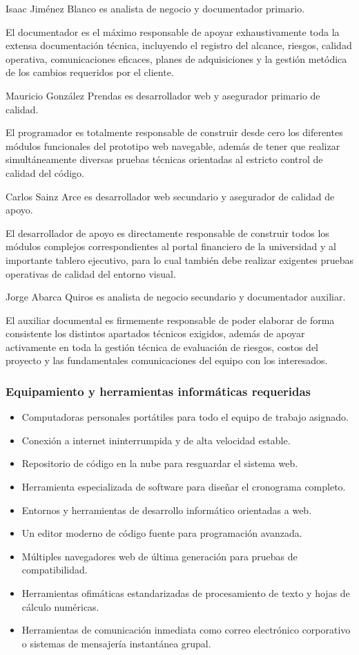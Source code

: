 \documentclass[11pt,spanish]{article}
\begin{document}
Isaac Jiménez Blanco es analista de negocio y documentador primario.

El documentador es el máximo responsable de apoyar exhaustivamente toda la extensa documentación técnica, incluyendo el registro del alcance, riesgos, calidad operativa, comunicaciones eficaces, planes de adquisiciones y la gestión metódica de los cambios requeridos por el cliente.

Mauricio González Prendas es desarrollador web y asegurador primario de calidad.

El programador es totalmente responsable de construir desde cero los diferentes módulos funcionales del prototipo web navegable, además de tener que realizar simultáneamente diversas pruebas técnicas orientadas al estricto control de calidad del código.

Carlos Sainz Arce es desarrollador web secundario y asegurador de calidad de apoyo.

El desarrollador de apoyo es directamente responsable de construir todos los módulos complejos correspondientes al portal financiero de la universidad y al importante tablero ejecutivo, para lo cual también debe realizar exigentes pruebas operativas de calidad del entorno visual.

Jorge Abarca Quiros es analista de negocio secundario y documentador auxiliar.

El auxiliar documental es firmemente responsable de poder elaborar de forma consistente los distintos apartados técnicos exigidos, además de apoyar activamente en toda la gestión técnica de evaluación de riesgos, costos del proyecto y las fundamentales comunicaciones del equipo con los interesados.

\subsubsection{Equipamiento y herramientas informáticas requeridas}

\begin{itemize}
    \item Computadoras personales portátiles para todo el equipo de trabajo asignado.
    \item Conexión a internet ininterrumpida y de alta velocidad estable.
    \item Repositorio de código en la nube para resguardar el sistema web.
    \item Herramienta especializada de software para diseñar el cronograma completo.
    \item Entornos y herramientas de desarrollo informático orientadas a web.
    \item Un editor moderno de código fuente para programación avanzada.
    \item Múltiples navegadores web de última generación para pruebas de compatibilidad.
    \item Herramientas ofimáticas estandarizadas de procesamiento de texto y hojas de cálculo numéricas.
    \item Herramientas de comunicación inmediata como correo electrónico corporativo o sistemas de mensajería instantánea grupal.
\end{itemize}
\end{document}
